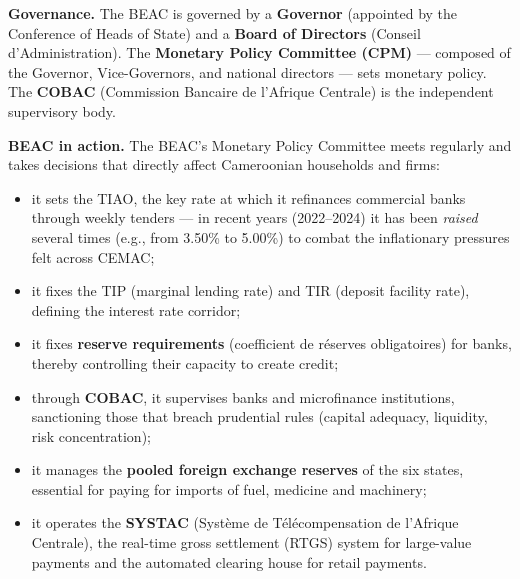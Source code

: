 \documentclass[11pt]{article}
\newcommand{\cle}[1]{{\popxbold\color{popdark}#1}}
\begin{document}
\textbf{Governance.} The BEAC is governed by a \textbf{Governor} (appointed by the Conference of Heads of State) and a \textbf{Board of Directors} (Conseil d'Administration). The \textbf{Monetary Policy Committee (CPM)} — composed of the Governor, Vice-Governors, and national directors — sets monetary policy. The \textbf{COBAC} (Commission Bancaire de l'Afrique Centrale) is the independent supervisory body.

\textbf{BEAC in action.} The BEAC's Monetary Policy Committee meets regularly and takes decisions that directly affect Cameroonian households and firms:
\begin{itemize}
\item it sets the \cle{TIAO}, the key rate at which it refinances commercial banks through weekly tenders — in recent years (2022–2024) it has been \emph{raised} several times (e.g., from 3.50\% to 5.00\%) to combat the inflationary pressures felt across CEMAC;
\item it fixes the \cle{TIP} (marginal lending rate) and \cle{TIR} (deposit facility rate), defining the interest rate corridor;
\item it fixes \textbf{reserve requirements} (coefficient de réserves obligatoires) for banks, thereby controlling their capacity to create credit;
\item through \textbf{COBAC}, it supervises banks and microfinance institutions, sanctioning those that breach prudential rules (capital adequacy, liquidity, risk concentration);
\item it manages the \textbf{pooled foreign exchange reserves} of the six states, essential for paying for imports of fuel, medicine and machinery;
\item it operates the \textbf{SYSTAC} (Système de Télécompensation de l'Afrique Centrale), the real-time gross settlement (RTGS) system for large-value payments and the automated clearing house for retail payments.
\end{itemize}
\end{document}
